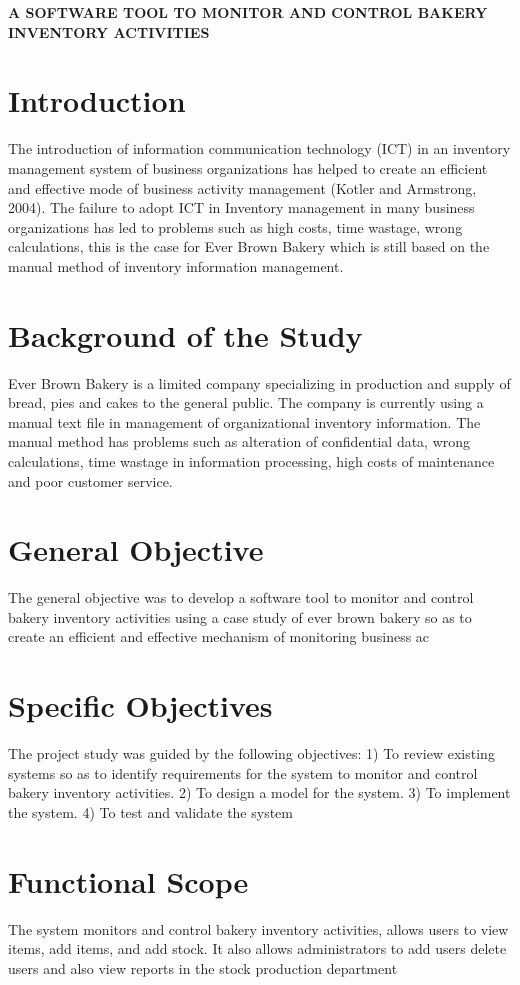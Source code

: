 \documentclass[options]{article}
\begin{document}
\textbf{A SOFTWARE TOOL TO MONITOR AND CONTROL BAKERY INVENTORY ACTIVITIES}
\section{\textbf{Introduction}}
The introduction of information communication technology (ICT) in an inventory management system of business organizations has helped to create an efficient and effective mode of business activity management (Kotler and Armstrong, 2004). The failure to adopt ICT in Inventory management in many business organizations has led to problems such as high costs, time wastage, wrong calculations, this is the case for Ever Brown Bakery which is still based on the manual method of inventory information management.
\section{\textbf{Background of the Study}}
Ever Brown Bakery is a limited company specializing in production and supply of bread, pies and cakes to the general public. The company is currently using a manual text file in management of organizational inventory information. The manual method has problems such as alteration of confidential data, wrong calculations, time wastage in information processing, high costs of maintenance and poor customer service.
\section{\textbf{General Objective}}
 The general objective was to develop a software tool to monitor and control bakery inventory activities using a case study of ever brown bakery so as to create an efficient and effective mechanism of monitoring business ac
\section{\textbf{Specific Objectives}}
The project study was guided by the following objectives:
1)	To review existing systems so as to identify requirements for the system to monitor and control bakery inventory activities.
2)	To design a model for the system.
3)	To implement the system.
4)	To test and validate the system
\section{\textbf{ Functional Scope}}
The system monitors and control bakery inventory activities, allows users to view items, add items, and add stock. It also allows administrators to add users delete users and also view reports in the stock production department
\end{document}
